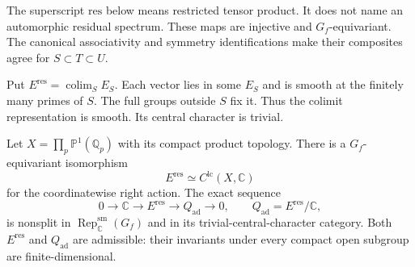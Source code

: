 The superscript $\mathrm{res}$ below means restricted tensor product. It does not name an automorphic residual spectrum. These maps are injective and $G_f$-equivariant. The canonical associativity
and symmetry identifications make their composites agree for
$S\subset T\subset U$.

Put $E^{\mathrm{res}}=\operatorname{colim}_S E_S$.
Each vector lies in some $E_S$ and is smooth at the finitely
many primes of $S$. The full groups outside $S$ fix it.
Thus the colimit representation is smooth. Its central character is trivial.

\begin{proposition}\label{v4-arith:ic:w10-d:adelic:prop:global}
Let $X=\prod_p\mathbb P^1(\mathbb Q_p)$ with its compact product topology.
There is a $G_f$-equivariant isomorphism
\[
 E^{\mathrm{res}}\simeq C^{\mathrm{lc}}(X,\mathbb C)
\]
for the coordinatewise right action. The exact sequence
\begin{equation}\label{v4-arith:ic:w10-d:adelic:eq:global}
 0\longrightarrow\mathbb C\longrightarrow E^{\mathrm{res}}
       \longrightarrow Q_{\mathrm{ad}}\longrightarrow0,
 \qquad Q_{\mathrm{ad}}=E^{\mathrm{res}}/\mathbb C,
\end{equation}
is nonsplit in $\operatorname{Rep}^{\mathrm{sm}}_{\mathbb C}(G_f)$ and in its trivial-central-character category.
Both $E^{\mathrm{res}}$ and $Q_{\mathrm{ad}}$ are admissible: their invariants under
every compact open subgroup are finite-dimensional.
\end{proposition}
